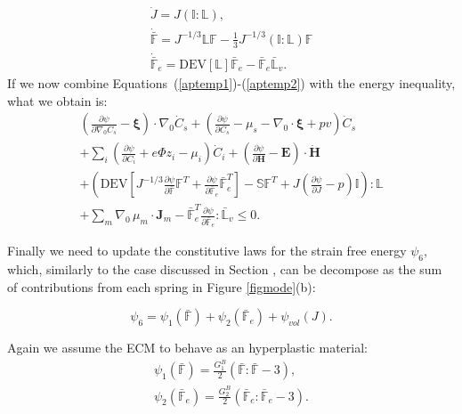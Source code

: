 \documentclass[runningheads]{llncs}
\newcommand{\F}{\ensuremath{\mathbb{F}}}
\newcommand{\LL}{\ensuremath{\mathbb{L}}}
\begin{document}
\begin{gather}
\dot{J} = J (\mathbb{I}:\LL),\\
\dot{\bar{\F}} = J^{-1/3} \LL \F - \frac{1}{3} J^{-1/3} (\mathbb{I}:\LL) \F \\
\dot{\bar{\F}}_e = \text{DEV}[\LL] \bar{\F}_e -\bar{\F}_e \bar{\LL}_v.\label{aptemp2}
\end{gather}
If we now combine Equations~(\ref{aptemp1})-(\ref{aptemp2}) with the energy inequality, what we obtain is:
\begin{equation}
\begin{aligned}
\left(\frac{\partial \psi}{\partial \nabla_0 C_s}-\boldsymbol{\xi}\right) \cdot \nabla_0 \dot{C}_s + \left(\frac{\partial \psi}{\partial C_s}-\mu_s-\nabla_0 \cdot \boldsymbol{\xi}+p v\right)\dot{C}_s\\
+ \sum_i\left(\frac{\partial \psi}{\partial C_i} + e\Phi z_i-\mu_i\right) \dot{C}_i +\left(\frac{\partial \psi}{\partial \mathbf{H}}-\mathbf{E}\right) \cdot \dot{\mathbf{H}}\\
 +\left(\text{DEV}\left[J^{-1/3}\frac{\partial \psi}{\partial \bar{\F}}\F^T + \frac{\partial \psi}{\partial \bar{\F}_e}\bar{\F}_e^{T}\right]- \mathbb{S}\F^T +J\left(\frac{\partial \psi}{\partial J} - p\right)\mathbb{I}\right):\LL\\
 + \sum_m \nabla_0 \,\mu_m \cdot \mathbf{J}_m - \bar{\F}_e^T\frac{\partial \psi}{\partial \bar{\F}_e}:\mathbb{\bar{L}}_v\leq 0 . \label{ineq2}
\end{aligned}
\end{equation}

Finally we need to update the constitutive laws for the strain free energy $\psi_6$, which, similarly to the case discussed in Section , can be decompose as the sum of contributions from each spring in Figure \ref{figmode}(b):

\begin{equation}
\psi_6 = \psi_1(\bar{\F}) + \psi_2(\bar{\F}_e) + \psi_{vol}(J).
\end{equation}

Again we assume the ECM to behave as an hyperplastic material:
\begin{eqnarray}
\psi_1(\bar{\F}) = \frac{G^B_1}{2} \left(\bar{\F}:\bar{\F} - 3\right),\\
\psi_2(\bar{\F}_e) = \frac{G^B_2}{2} \left(\bar{\F}_e:\bar{\F}_e - 3 \right).
\end{eqnarray}
\end{document}
